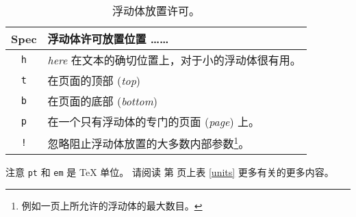 \begin{table}[!bp]
\caption{浮动体放置许可。}\label{tab:permiss} \noindent
\begin{minipage}{\textwidth}
\medskip
\begin{center}
\begin{tabular}{@{}cp{8cm}@{}}
Spec&浮动体许可放置位置 ……\\
\hline
\rule{0pt}{1.05em}\texttt{h} & \emph{here} 在文本的确切位置上，对于小的浮动体很有用。\\[0.3ex]
\texttt{t} & 在页面的顶部 (\emph{top})\\[0.3ex]
\texttt{b} & 在页面的底部 (\emph{bottom})\\[0.3ex]
\texttt{p} & 在一个只有浮动体的专门的页面 (\emph{page}) 上。\\[0.3ex]
\texttt{!} &
忽略阻止浮动体放置的大多数内部参数\footnote{例如一页上所允许的浮动体的最大数目。}。
\end{tabular}
\end{center}
注意 \texttt{pt} 和 \texttt{em} 是 \TeX{} 单位。
请阅读 第 \pageref{units} 页上表 \ref{units} 更多有关的更多内容。
\end{minipage}
\end{table}

